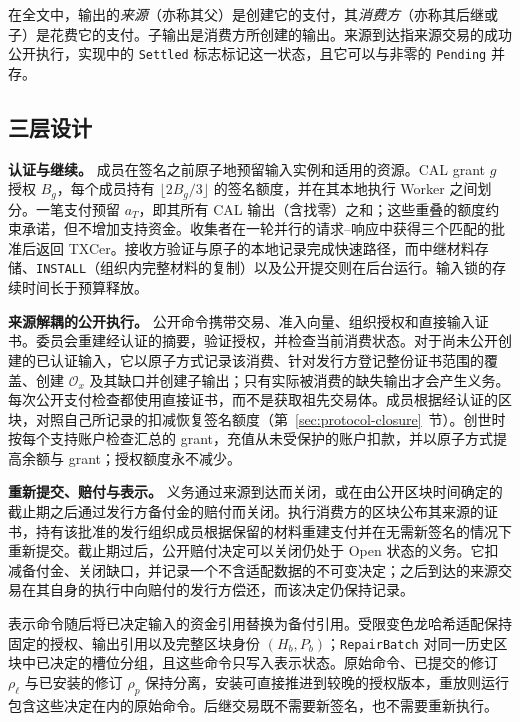 在全文中，输出的\emph{来源}（亦称其父）是创建它的支付，其\emph{消费方}（亦称其后继或子）是花费它的支付。子输出是消费方所创建的输出。来源到达指来源交易的成功公开执行，实现中的 \texttt{Settled} 标志标记这一状态，且它可以与非零的 \texttt{Pending} 并存。

\subsection{三层设计}
\label{sec:model-layers}
\noindent\textbf{认证与继续。}
成员在签名之前原子地预留输入实例和适用的资源。CAL grant $g$ 授权 $B_g$，每个成员持有 $\lfloor2B_g/3\rfloor$ 的签名额度，并在其本地执行 Worker 之间划分。一笔支付预留 $a_T$，即其所有 CAL 输出（含找零）之和；这些重叠的额度约束承诺，但不增加支持资金。收集者在一轮并行的请求--响应中获得三个匹配的批准后返回 TXCer。接收方验证与原子的本地记录完成快速路径，而中继材料存储、\texttt{INSTALL}（组织内完整材料的复制）以及公开提交则在后台运行。输入锁的存续时间长于预算释放。

\noindent\textbf{来源解耦的公开执行。}
公开命令携带交易、准入向量、组织授权和直接输入证书。委员会重建经认证的摘要，验证授权，并检查当前消费状态。对于尚未公开创建的已认证输入，它以原子方式记录该消费、针对发行方登记整份证书范围的覆盖、创建 $\mathcal O_x$ 及其缺口并创建子输出；只有实际被消费的缺失输出才会产生义务。每次公开支付检查都使用直接证书，而不是获取祖先交易体。成员根据经认证的区块，对照自己所记录的扣减恢复签名额度（第~\ref{sec:protocol-closure}~节）。创世时按每个支持账户检查汇总的 grant，充值从未受保护的账户扣款，并以原子方式提高余额与 grant；授权额度永不减少。

\noindent\textbf{重新提交、赔付与表示。}
义务通过来源到达而关闭，或在由公开区块时间确定的截止期之后通过发行方备付金的赔付而关闭。执行消费方的区块公布其来源的证书，持有该批准的发行组织成员根据保留的材料重建支付并在无需新签名的情况下重新提交。截止期过后，公开赔付决定可以关闭仍处于 Open 状态的义务。它扣减备付金、关闭缺口，并记录一个不含适配数据的不可变决定；之后到达的来源交易在其自身的执行中向赔付的发行方偿还，而该决定仍保持记录。

表示命令随后将已决定输入的资金引用替换为备付引用。受限变色龙哈希适配保持固定的授权、输出引用以及完整区块身份 $(H_b,P_b)$；\texttt{RepairBatch} 对同一历史区块中已决定的槽位分组，且这些命令只写入表示状态。原始命令、已提交的修订 $\rho_\ell$ 与已安装的修订 $\rho_p$ 保持分离，安装可直接推进到较晚的授权版本，重放则运行包含这些决定在内的原始命令。后继交易既不需要新签名，也不需要重新执行。
